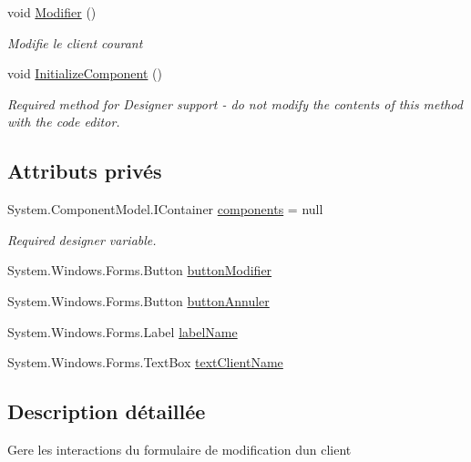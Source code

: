 \begin{DoxyCompactItemize}
void \mbox{\hyperlink{class_m_t_connect_agent_1_1_form_modifie_client_a3afd18ad3968998f66567dad318a17f9}{Modifier}} ()
\begin{DoxyCompactList}\small\item\em Modifie le client courant \end{DoxyCompactList}\item 
void \mbox{\hyperlink{class_m_t_connect_agent_1_1_form_modifie_client_abf0bb8649ca1a2917984ee61f9c590e5}{Initialize\+Component}} ()
\begin{DoxyCompactList}\small\item\em Required method for Designer support -\/ do not modify the contents of this method with the code editor. \end{DoxyCompactList}\end{DoxyCompactItemize}
\subsection*{Attributs privés}
\begin{DoxyCompactItemize}
\item 
System.\+Component\+Model.\+I\+Container \mbox{\hyperlink{class_m_t_connect_agent_1_1_form_modifie_client_a684d0e616a4b30c46123a53b83f68b24}{components}} = null
\begin{DoxyCompactList}\small\item\em Required designer variable. \end{DoxyCompactList}\item 
System.\+Windows.\+Forms.\+Button \mbox{\hyperlink{class_m_t_connect_agent_1_1_form_modifie_client_a9bdaacfb53e85e0dde6835de9e7722bf}{button\+Modifier}}
\item 
System.\+Windows.\+Forms.\+Button \mbox{\hyperlink{class_m_t_connect_agent_1_1_form_modifie_client_a116bef14cd02d536e7f34fc0610f96e7}{button\+Annuler}}
\item 
System.\+Windows.\+Forms.\+Label \mbox{\hyperlink{class_m_t_connect_agent_1_1_form_modifie_client_a3ce819cd742694c37aed4ff866535f23}{label\+Name}}
\item 
System.\+Windows.\+Forms.\+Text\+Box \mbox{\hyperlink{class_m_t_connect_agent_1_1_form_modifie_client_ab476b3c44de6e7a73bcb78dc1b5a1ae6}{text\+Client\+Name}}
\end{DoxyCompactItemize}


\subsection{Description détaillée}
Gere les interactions du formulaire de modification d\textquotesingle{}un client 



